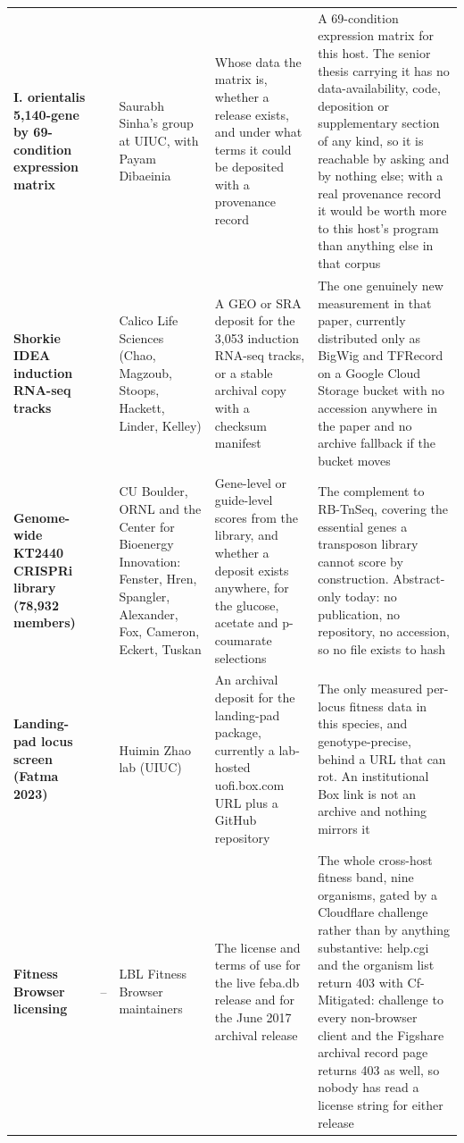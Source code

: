 \begin{landscape}
\begin{longtable}{@{}L{38mm} L{16mm} L{40mm} L{78mm} L{70mm}@{}}
\addlinespace[5pt]
\textbf{I. orientalis 5,140-gene by 69-condition expression matrix} &  & Saurabh Sinha's group at UIUC, with Payam Dibaeinia & Whose data the matrix is, whether a release exists, and under what terms it could be deposited with a provenance record & A 69-condition expression matrix for this host. The senior thesis carrying it has no data-availability, code, deposition or supplementary section of any kind, so it is reachable by asking and by nothing else; with a real provenance record it would be worth more to this host's program than anything else in that corpus \\
\addlinespace[5pt]
\textbf{Shorkie IDEA induction RNA-seq tracks} &  & Calico Life Sciences (Chao, Magzoub, Stoops, Hackett, Linder, Kelley) & A GEO or SRA deposit for the 3,053 induction RNA-seq tracks, or a stable archival copy with a checksum manifest & The one genuinely new measurement in that paper, currently distributed only as BigWig and TFRecord on a Google Cloud Storage bucket with no accession anywhere in the paper and no archive fallback if the bucket moves \\
\addlinespace[5pt]
\textbf{Genome-wide KT2440 CRISPRi library (78,932 members)} &  & CU Boulder, ORNL and the Center for Bioenergy Innovation: Fenster, Hren, Spangler, Alexander, Fox, Cameron, Eckert, Tuskan & Gene-level or guide-level scores from the library, and whether a deposit exists anywhere, for the glucose, acetate and p-coumarate selections & The complement to RB-TnSeq, covering the essential genes a transposon library cannot score by construction. Abstract-only today: no publication, no repository, no accession, so no file exists to hash \\
\addlinespace[5pt]
\textbf{Landing-pad locus screen (Fatma 2023)} &  & Huimin Zhao lab (UIUC) & An archival deposit for the landing-pad package, currently a lab-hosted uofi.box.com URL plus a GitHub repository & The only measured per-locus fitness data in this species, and genotype-precise, behind a URL that can rot. An institutional Box link is not an archive and nothing mirrors it \\
\addlinespace[5pt]
\textbf{Fitness Browser licensing} & -- & LBL Fitness Browser maintainers & The license and terms of use for the live feba.db release and for the June 2017 archival release & The whole cross-host fitness band, nine organisms, gated by a Cloudflare challenge rather than by anything substantive: help.cgi and the organism list return 403 with Cf-Mitigated: challenge to every non-browser client and the Figshare archival record page returns 403 as well, so nobody has read a license string for either release \\

\end{longtable}
\end{landscape}
